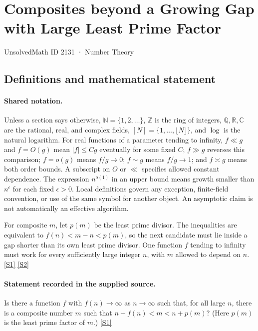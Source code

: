 \documentclass[11pt,a4paper]{article}
\newcommand{\N}{\mathbb{N}}
\newcommand{\Z}{\mathbb{Z}}
\newcommand{\Q}{\mathbb{Q}}
\newcommand{\R}{\mathbb{R}}
\newcommand{\C}{\mathbb{C}}
\newcommand{\sref}[2]{\hyperlink{source:#1:#2}{[S#2]}}
\begin{document}

\setcounter{section}{2130}

\section{Composites beyond a Growing Gap with Large Least Prime Factor}\label{2131}

{\small\sffamily UnsolvedMath ID 2131 · Number Theory}

\subsection{Definitions and mathematical statement}

\paragraph{Shared notation.}Unless a section says otherwise, $\N=\{1,2,\ldots\}$,
$\Z$ is the ring of integers, $\Q,\R,\C$ are the rational, real, and complex
fields, $[N]=\{1,\ldots,\lfloor N\rfloor\}$, and $\log$ is the natural
logarithm. For real functions of a parameter tending to infinity,
$f\ll g$ and $f=O(g)$ mean $|f|\leq Cg$ eventually for some fixed $C$;
$f\gg g$ reverses this comparison; $f=o(g)$ means $f/g\to0$;
$f\sim g$ means $f/g\to1$; and $f\asymp g$ means both order bounds.
A subscript on $O$ or $\ll$ specifies allowed constant dependence.
The expression $n^{o(1)}$ in an upper bound means growth smaller than
$n^\epsilon$ for each fixed $\epsilon>0$. Local definitions govern any
exception, finite-field convention, or use of the same symbol for another
object. An asymptotic claim is not automatically an effective algorithm.



For composite $m$, let $p(m)$ be the least prime divisor. The inequalities are equivalent to $f(n)<m-n<p(m)$, so the next candidate must lie inside a gap shorter than its own least prime divisor. One function $f$ tending to infinity must work for every sufficiently large integer $n$, with $m$ allowed to depend on $n$. \sref{2131}{1} \sref{2131}{2}

\paragraph{Statement recorded in the supplied source.}
Is there a function $f$ with $f(n)\to \infty$ as $n\to \infty$ such that, for all large $n$, there is a composite number $m$ such that $ n+f(n)<m<n+p(m)? $ (Here $p(m)$ is the least prime factor of $m$.) \sref{2131}{1}
\end{document}
